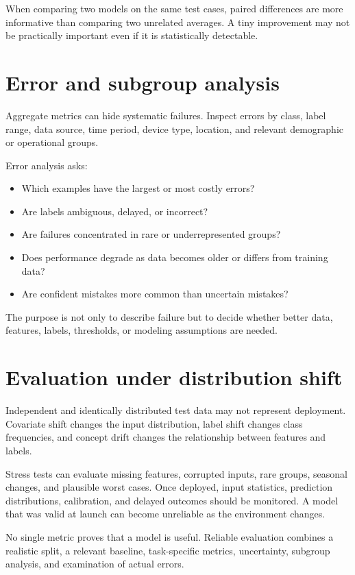 When comparing two models on the same test cases, paired differences are more informative than comparing two unrelated averages. A tiny improvement may not be practically important even if it is statistically detectable.

\section{Error and subgroup analysis}

Aggregate metrics can hide systematic failures. Inspect errors by class, label range, data source, time period, device type, location, and relevant demographic or operational groups.

Error analysis asks:

\begin{itemize}
  \item Which examples have the largest or most costly errors?
  \item Are labels ambiguous, delayed, or incorrect?
  \item Are failures concentrated in rare or underrepresented groups?
  \item Does performance degrade as data becomes older or differs from training data?
  \item Are confident mistakes more common than uncertain mistakes?
\end{itemize}

The purpose is not only to describe failure but to decide whether better data, features, labels, thresholds, or modeling assumptions are needed.

\section{Evaluation under distribution shift}

Independent and identically distributed test data may not represent deployment. Covariate shift changes the input distribution, label shift changes class frequencies, and concept drift changes the relationship between features and labels.

Stress tests can evaluate missing features, corrupted inputs, rare groups, seasonal changes, and plausible worst cases. Once deployed, input statistics, prediction distributions, calibration, and delayed outcomes should be monitored. A model that was valid at launch can become unreliable as the environment changes.

\begin{keyidea}
No single metric proves that a model is useful. Reliable evaluation combines a realistic split, a relevant baseline, task-specific metrics, uncertainty, subgroup analysis, and examination of actual errors.
\end{keyidea}

